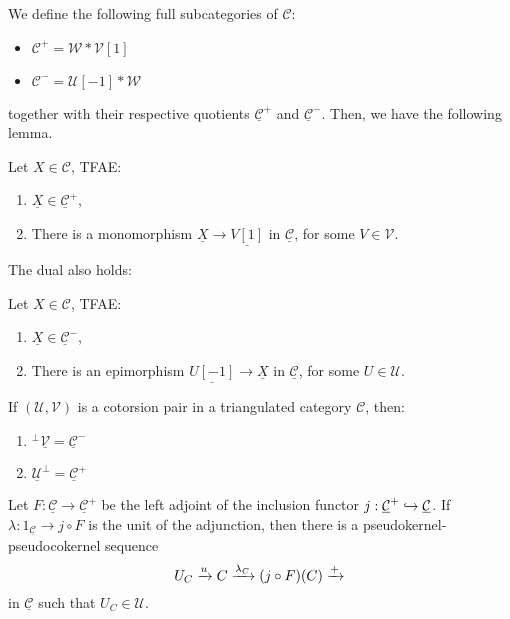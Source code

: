We define the following full subcategories of $\mathcal{C}$:
\begin{itemize}
  \item $\mathcal{C}^+ = \mathcal{W}\ast\mathcal{V}[1]$
  \item $\mathcal{C}^- = \mathcal{U}[-1]\ast\mathcal{W}$
\end{itemize}
together with their respective quotients $\underline{\mathcal{C}}^+$ and $\underline{\mathcal{C}}^-$.
Then, we have the following lemma.

\begin{lemma}\label{sec1:lem1}
  Let $X\in\mathcal{C}$, TFAE:
  \begin{enumerate}
    \item $\underline{X} \in \underline{\mathcal{C}}^+$,
    \item There is a monomorphism $\underline{X}\to \underline{V[1]}$ in
    $\underline{\mathcal{C}}$, for some $V\in\mathcal{V}$.
  \end{enumerate}
\end{lemma}

The dual also holds:

\begin{lemma}
  Let $X\in\mathcal{C}$, TFAE:
  \begin{enumerate}
    \item $\underline{X} \in \underline{\mathcal{C}}^-$,
    \item There is an epimorphism $\underline{U[-1]}\to \underline{X}$ in
    $\underline{\mathcal{C}}$, for some $U\in\mathcal{U}$.
  \end{enumerate}
\end{lemma}

\begin{corollary}
  If $(\mathcal{U},\mathcal{V})$ is a cotorsion pair in a triangulated category
  $\mathcal{C}$, then:
  \begin{enumerate}
    \item $^\perp\underline{\mathcal{V}} = \underline{\mathcal{C}}^-$
    \item $\underline{\mathcal{U}}^\perp = \underline{\mathcal{C}}^+$
  \end{enumerate}
\end{corollary}

\begin{lemma}\label{sec1:lem2}
  Let $F:\underline{\mathcal{C}}\to\underline{\mathcal{C}}^+$ be the left adjoint
  of the inclusion functor $j:\underline{\mathcal{C}}^+ \hookrightarrow \underline{\mathcal{C}}$.
  If $\lambda:1_{\underline{\mathcal{C}}} \to j\circ F$ is the unit of the adjunction, then there is a pseudokernel-pseudocokernel
  sequence
  \begin{equation*}
    U_C\xrightarrow{u}C\xrightarrow{\lambda_{C}}(j\circ F)(C)\xrightarrow{+}
  \end{equation*}
  in $\underline{\mathcal{C}}$ such that $U_C\in \mathcal{U}$.
\end{lemma}

